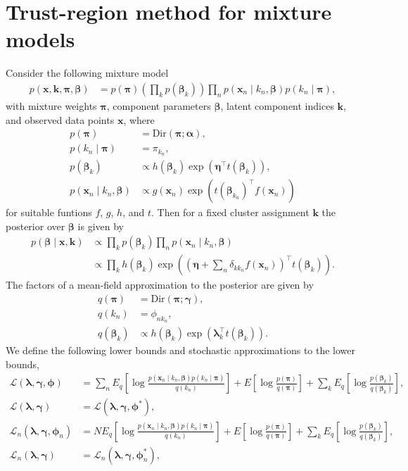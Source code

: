 \documentclass[a4paper]{article}
\begin{document}
	\section*{Trust-region method for mixture models}
		Consider the following mixture model
		\begin{align}
			p(\mathbf{x}, \mathbf{k}, \bm{\pi}, \bm{\beta})
			&= p(\bm{\pi}) \left( \prod_k p(\bm{\beta}_k) \right) \prod_n p(\mathbf{x}_n \mid k_n, \bm{\beta}) p(k_n \mid \bm{\pi}),
		\end{align}
		with mixture weights $\bm{\pi}$, component parameters $\bm{\beta}$, latent component indices $\mathbf{k}$, and observed data points
		$\mathbf{x}$, where
		\begin{align}
			p(\bm{\pi}) &= \text{Dir}(\bm{\pi}; \bm{\alpha}), \\
			p(k_n \mid \bm{\pi}) &= \pi_{k_n}, \\
			p(\bm{\beta}_k) &\propto h(\bm{\beta}_k) \exp\left( \bm{\eta}^\top t(\bm{\beta}_k) \right), \\
			p(\mathbf{x}_n \mid k_n, \bm{\beta}) &\propto g(\mathbf{x}_n) \exp\left( t(\bm{\beta}_{k_n})^\top f(\mathbf{x}_n) \right)
		\end{align}
		for suitable funtions $f$, $g$, $h$, and $t$.
		Then for a fixed cluster assignment $\mathbf{k}$ the posterior over $\bm{\beta}$ is given by
		\begin{align}
			p(\bm{\beta} \mid \mathbf{x}, \bm{k}) 
			&\propto \prod_k p(\bm{\beta}_k) \prod_n p(\mathbf{x}_n \mid k_n, \bm{\beta}) \\
			&\propto \prod_k h(\bm{\beta}_k) \exp\left( \left(\bm{\eta} + \sum_n \delta_{kk_n} f(\mathbf{x}_n)\right)^\top t(\bm{\beta}_k) \right).
		\end{align}
		The factors of a mean-field approximation to the posterior are given by
		\begin{align}
			q(\bm{\pi}) &= \text{Dir}(\bm{\pi}; \bm{\gamma}), \\
			q(k_n) &= \phi_{nk_n}, \\
			q(\bm{\beta}_k) &\propto h(\bm{\beta}_k) \exp\left(\bm{\lambda}_k^\top t(\bm{\beta}_k)\right).
		\end{align}
		We define the following lower bounds and stochastic approximations to the lower bounds,
		\begin{align}
			\mathcal{L}(\bm{\lambda}, \bm{\gamma}, \bm{\phi})
			&= \sum_n E_q\left[ \log \frac{p(\mathbf{x}_n \mid k_n, \bm{\beta}) p(k_n \mid \bm{\pi})}{q(k_n)} \right]
			+ E\left[\log \frac{p(\bm{\pi})}{q(\bm{\pi})}\right] + \sum_k E_q\left[\log \frac{p(\bm{\beta}_k)}{q(\bm{\beta}_k)}\right], \\
			\mathcal{L}(\bm{\lambda}, \bm{\gamma})
			&= \mathcal{L}(\bm{\lambda}, \bm{\gamma}, \bm{\phi}^*), \\
			\mathcal{L}_n(\bm{\lambda}, \bm{\gamma}, \bm{\phi}_n)
			&= N E_q\left[ \log \frac{p(\mathbf{x}_n \mid k_n, \bm{\beta}) p(k_n \mid \bm{\pi})}{q(k_n)} \right]
			+ E\left[\log \frac{p(\bm{\pi})}{q(\bm{\pi})}\right] + \sum_k E_q\left[\log \frac{p(\bm{\beta}_k)}{q(\bm{\beta}_k)}\right], \\
			\mathcal{L}_n(\bm{\lambda}, \bm{\gamma})
			&= \mathcal{L}_n(\bm{\lambda}, \bm{\gamma}, \bm{\phi}_n^*),
		\end{align}
\end{document}
